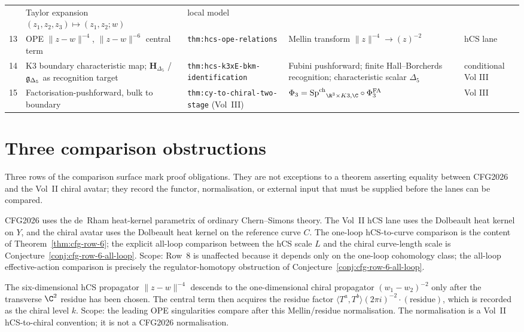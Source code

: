 {\begin{center}
\begin{tabular}{p{0.7cm}p{3.5cm}p{3.3cm}p{3.3cm}p{1.9cm}}
 & Taylor expansion $(z_1,z_2,z_3)\mapsto(z_1,z_2;w)$
 & local model \\
13 & OPE $\|z-w\|^{-4}$, $\|z-w\|^{-6}$ central term
 & \texttt{thm:hcs-ope-relations}
 & Mellin transform $\|z\|^{-4}\to (z)^{-2}$
 & hCS lane \\
14 & K3 boundary characteristic map; $\mathbf H_{\Delta_5}$ /
$\mathfrak{g}_{\Delta_5}$ as recognition target
 & \texttt{thm:hcs-k3xE-bkm-identification}
 & Fubini pushforward; finite Hall--Borcherds recognition;
 characteristic scalar $\Delta_5$
 & conditional Vol III \\
15 & Factorisation-pushforward, bulk to boundary
 & \texttt{thm:cy-to-chiral-two-stage} (Vol~III)
 & $\Phi_3 = {\SpCh}_{\R^3\times K3,\C}\circ\PhiFA_3$
 & Vol III \\
\bottomrule
\end{tabular}
\end{center}
}

\section{Three comparison obstructions}
\label{sec:cfg-imperfect-rows}

Three rows of the comparison surface mark proof obligations. They are
not exceptions to a theorem asserting equality between CFG2026 and the
Vol~II chiral avatar; they record the functor, normalisation, or
external input that must be supplied before the lanes can be compared.

\begin{remark}
\label{rem:cfg-imperfect-row-6}
CFG2026 uses the de~Rham heat-kernel parametrix of ordinary
Chern--Simons theory. The Vol~II hCS lane uses the Dolbeault heat
kernel on $Y$, and the chiral avatar uses the Dolbeault heat kernel on
the reference curve $C$. The one-loop hCS-to-curve comparison is the
content of Theorem~\ref{thm:cfg-row-6}; the explicit all-loop
comparison between the hCS scale $L$ and the chiral curve-length scale
is Conjecture~\ref{conj:cfg-row-6-all-loop}. Scope: Row~8 is unaffected
because it depends only on the one-loop cohomology class; the all-loop
effective-action comparison is precisely the regulator-homotopy
obstruction of Conjecture~\ref{conj:cfg-row-6-all-loop}.
\end{remark}

\begin{remark}
\label{rem:cfg-imperfect-row-13}
The six-dimensional hCS propagator $\|z-w\|^{-4}$ descends to the
one-dimensional chiral propagator $(w_1-w_2)^{-2}$ only after the
transverse $\C^2$ residue has been chosen. The central term then
acquires the residue factor
$\langle T^a,T^b\rangle(2\pi i)^{-2}\cdot(\mathrm{residue})$, which is
recorded as the chiral level $k$. Scope: the leading OPE singularities
compare after this Mellin/residue normalisation. The normalisation is a
Vol~II hCS-to-chiral convention; it is not a CFG2026 normalisation.
\end{remark}


